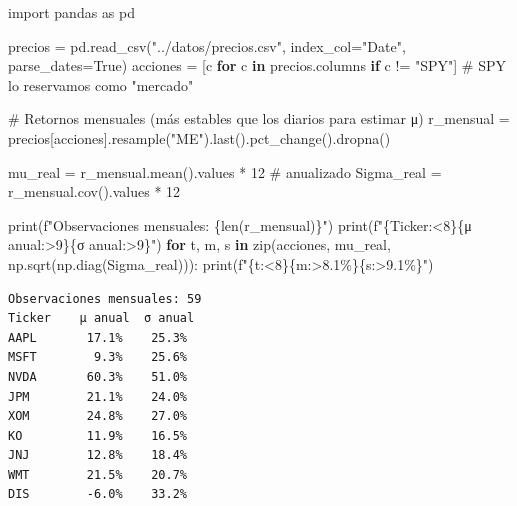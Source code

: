 \documentclass[
  spanish,
  letterpaper,
  DIV=11,
  numbers=noendperiod]{scrreprt}
\newenvironment{Shaded}{\begin{snugshade}}{\end{snugshade}}
\newcommand{\BuiltInTok}[1]{\textcolor[rgb]{0.00,0.23,0.31}{#1}}
\newcommand{\CommentTok}[1]{\textcolor[rgb]{0.37,0.37,0.37}{#1}}
\newcommand{\ControlFlowTok}[1]{\textcolor[rgb]{0.00,0.23,0.31}{\textbf{#1}}}
\newcommand{\DecValTok}[1]{\textcolor[rgb]{0.68,0.00,0.00}{#1}}
\newcommand{\ImportTok}[1]{\textcolor[rgb]{0.00,0.46,0.62}{#1}}
\newcommand{\KeywordTok}[1]{\textcolor[rgb]{0.00,0.23,0.31}{\textbf{#1}}}
\newcommand{\NormalTok}[1]{\textcolor[rgb]{0.00,0.23,0.31}{#1}}
\newcommand{\OperatorTok}[1]{\textcolor[rgb]{0.37,0.37,0.37}{#1}}
\newcommand{\SpecialCharTok}[1]{\textcolor[rgb]{0.37,0.37,0.37}{#1}}
\newcommand{\SpecialStringTok}[1]{\textcolor[rgb]{0.13,0.47,0.30}{#1}}
\newcommand{\StringTok}[1]{\textcolor[rgb]{0.13,0.47,0.30}{#1}}
\newcommand{\VariableTok}[1]{\textcolor[rgb]{0.07,0.07,0.07}{#1}}
\begin{document}
\label{datos-reales}
\begin{Shaded}
\begin{Highlighting}[]
\ImportTok{import}\NormalTok{ pandas }\ImportTok{as}\NormalTok{ pd}

\NormalTok{precios }\OperatorTok{=}\NormalTok{ pd.read\_csv(}\StringTok{"../datos/precios.csv"}\NormalTok{, index\_col}\OperatorTok{=}\StringTok{"Date"}\NormalTok{, parse\_dates}\OperatorTok{=}\VariableTok{True}\NormalTok{)}
\NormalTok{acciones }\OperatorTok{=}\NormalTok{ [c }\ControlFlowTok{for}\NormalTok{ c }\KeywordTok{in}\NormalTok{ precios.columns }\ControlFlowTok{if}\NormalTok{ c }\OperatorTok{!=} \StringTok{"SPY"}\NormalTok{]   }\CommentTok{\# SPY lo reservamos como "mercado"}

\CommentTok{\# Retornos mensuales (más estables que los diarios para estimar μ)}
\NormalTok{r\_mensual }\OperatorTok{=}\NormalTok{ precios[acciones].resample(}\StringTok{"ME"}\NormalTok{).last().pct\_change().dropna()}

\NormalTok{mu\_real }\OperatorTok{=}\NormalTok{ r\_mensual.mean().values }\OperatorTok{*} \DecValTok{12}                  \CommentTok{\# anualizado}
\NormalTok{Sigma\_real }\OperatorTok{=}\NormalTok{ r\_mensual.cov().values }\OperatorTok{*} \DecValTok{12}

\BuiltInTok{print}\NormalTok{(}\SpecialStringTok{f"Observaciones mensuales: }\SpecialCharTok{\{}\BuiltInTok{len}\NormalTok{(r\_mensual)}\SpecialCharTok{\}}\SpecialStringTok{"}\NormalTok{)}
\BuiltInTok{print}\NormalTok{(}\SpecialStringTok{f"}\SpecialCharTok{\{}\StringTok{\textquotesingle{}Ticker\textquotesingle{}}\SpecialCharTok{:\textless{}8\}\{}\StringTok{\textquotesingle{}μ anual\textquotesingle{}}\SpecialCharTok{:\textgreater{}9\}\{}\StringTok{\textquotesingle{}σ anual\textquotesingle{}}\SpecialCharTok{:\textgreater{}9\}}\SpecialStringTok{"}\NormalTok{)}
\ControlFlowTok{for}\NormalTok{ t, m, s }\KeywordTok{in} \BuiltInTok{zip}\NormalTok{(acciones, mu\_real, np.sqrt(np.diag(Sigma\_real))):}
    \BuiltInTok{print}\NormalTok{(}\SpecialStringTok{f"}\SpecialCharTok{\{}\NormalTok{t}\SpecialCharTok{:\textless{}8\}\{}\NormalTok{m}\SpecialCharTok{:\textgreater{}8.1\%\}\{}\NormalTok{s}\SpecialCharTok{:\textgreater{}9.1\%\}}\SpecialStringTok{"}\NormalTok{)}
\end{Highlighting}
\end{Shaded}

\begin{verbatim}
Observaciones mensuales: 59
Ticker    μ anual  σ anual
AAPL       17.1%    25.3%
MSFT        9.3%    25.6%
NVDA       60.3%    51.0%
JPM        21.1%    24.0%
XOM        24.8%    27.0%
KO         11.9%    16.5%
JNJ        12.8%    18.4%
WMT        21.5%    20.7%
DIS        -6.0%    33.2%
\end{verbatim}
\end{document}
